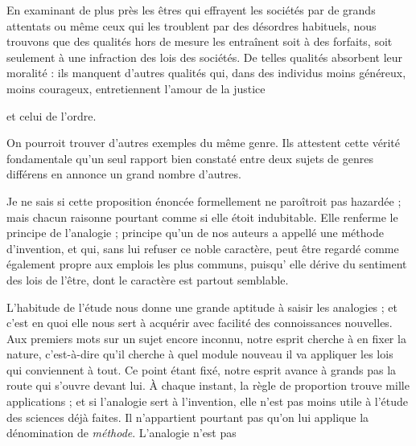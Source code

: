 \documentclass[11pt,a4paper]{article}
\begin{document}
En examinant de plus près les êtres qui effrayent les sociétés par de grands
attentats ou même ceux qui les troublent par des désordres habituels, nous
 trouvons que des qualités hors de mesure les entraînent soit à
des forfaits, soit seulement à une  infraction des lois
des sociétés. De telles qualités absorbent leur 
moralité :
ils manquent d'autres qualités qui, dans des individus moins généreux, moins
courageux, entretiennent l'amour de la justice

et celui de l'ordre.

On pourroit trouver d'autres exemples du même genre. Ils attestent cette
vérité fondamentale qu'un seul rapport bien constaté entre deux sujets de
genres différens en annonce un grand nombre d'autres.

Je ne sais si cette proposition énoncée formellement ne paroîtroit pas
hazardée ; mais chacun  raisonne pourtant comme si elle étoit indubitable. 
Elle renferme le principe de l'analogie ; principe qu'un de nos auteurs a
 appellé une méthode d'invention, et qui, sans lui
refuser ce noble caractère,  peut être regardé comme
également propre aux emplois les plus communs, puisqu' elle
dérive du sentiment des lois de l'être, dont le caractère est partout
semblable.

L'habitude de l'étude nous donne une grande aptitude à saisir les
analogies ; et c'est en quoi elle nous sert à acquérir avec facilité des
connoissances nouvelles. Aux premiers mots sur un sujet encore inconnu, notre
esprit cherche à en fixer la nature, c'est-à-dire qu'il cherche à quel
module nouveau il va appliquer les lois qui  conviennent à
tout. Ce point étant fixé, notre esprit avance à grands pas
 la route qui s'ouvre  devant lui. À chaque
instant, la règle de proportion trouve mille applications ; et si l'analogie
sert à l'invention, elle n'est pas moins utile à l'étude des sciences déjà
faites. Il n'appartient pourtant pas qu'on lui applique la dénomination de
\emph{méthode}. L'analogie n'est pas
\end{document}
